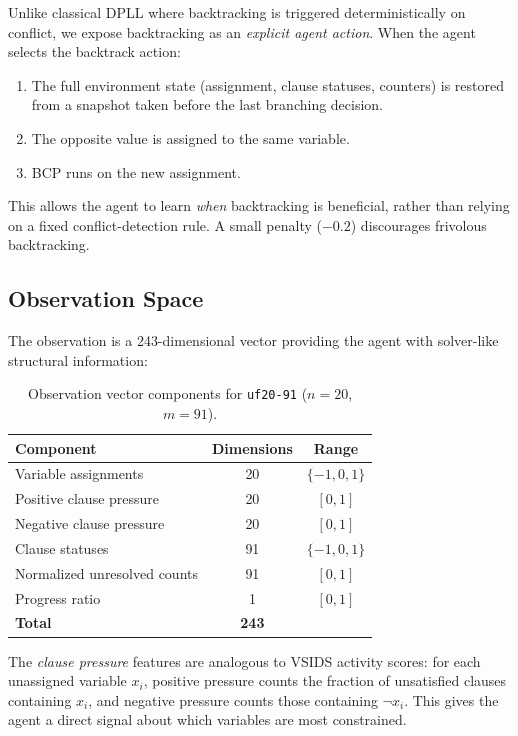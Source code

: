\documentclass{article}
\begin{document}
Unlike classical DPLL where backtracking is triggered deterministically on conflict, we expose backtracking as an \emph{explicit agent action}. When the agent selects the backtrack action:
\begin{enumerate}
    \item The full environment state (assignment, clause statuses, counters) is restored from a snapshot taken before the last branching decision.
    \item The opposite value is assigned to the same variable.
    \item BCP runs on the new assignment.
\end{enumerate}

This allows the agent to learn \emph{when} backtracking is beneficial, rather than relying on a fixed conflict-detection rule. A small penalty ($-0.2$) discourages frivolous backtracking.

\subsection{Observation Space}
\label{sec:observations}

The observation is a 243-dimensional vector providing the agent with solver-like structural information:

\begin{table}[h]
\centering
\caption{Observation vector components for \texttt{uf20-91} ($n=20$, $m=91$).}
\label{tab:obs}
\begin{tabular}{@{}lcc@{}}
\toprule
Component & Dimensions & Range \\
\midrule
Variable assignments & 20 & $\{-1, 0, 1\}$ \\
Positive clause pressure & 20 & $[0, 1]$ \\
Negative clause pressure & 20 & $[0, 1]$ \\
Clause statuses & 91 & $\{-1, 0, 1\}$ \\
Normalized unresolved counts & 91 & $[0, 1]$ \\
Progress ratio & 1 & $[0, 1]$ \\
\midrule
\textbf{Total} & \textbf{243} & \\
\bottomrule
\end{tabular}
\end{table}

The \emph{clause pressure} features are analogous to VSIDS activity scores: for each unassigned variable $x_i$, positive pressure counts the fraction of unsatisfied clauses containing $x_i$, and negative pressure counts those containing $\neg x_i$. This gives the agent a direct signal about which variables are most constrained.
\end{document}

